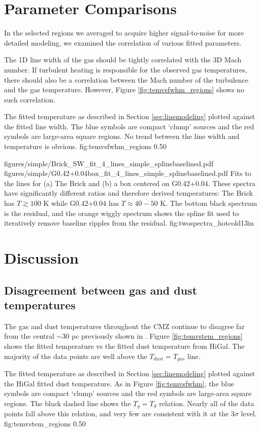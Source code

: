 \section{Parameter Comparisons}
In the selected regions we averaged to acquire higher signal-to-noise for more
detailed modeling, we examined the correlation of various fitted parameters.

The 1D line width of the gas should be tightly correlated with the 3D Mach
number.  If turbulent heating is responsible for the observed gas temperatures,
there should also be a correlation between the Mach number of the turbulence
and the gas temperature.  However, Figure \ref{fig:temvsfwhm_regions} shows no
such correlation.

{The fitted temperature as described in Section \ref{sec:linemodeling} plotted against
the fitted line width.  The blue symbols are compact `clump' sources and the red symbols
are large-area square regions.  No trend between the line width and temperature
is obvious.}
{fig:temvsfwhm_regions}
{0.5}{0}


\FigureTwo
{figures/simple/Brick_SW_fit_4_lines_simple_splinebaselined.pdf}
{figures/simple/G0.42+0.04box_fit_4_lines_simple_splinebaselined.pdf}
{Fits to the \para lines for (a) The Brick and (b) a box centered on G0.42+0.04.
These spectra have significantly different ratios and therefore derived temperatures:
The Brick has $T\gtrsim100$ K while G0.42+0.04 has $T\approx40-50$ K.
The bottom black spectrum is the residual, and the orange wiggly spectrum shows
the spline fit used to iteratively remove baseline ripples from the residual.}
{fig:twospectra_hotcold}{1}{3in}

\section{Discussion}
\subsection{Disagreement between gas and dust temperatures}
The gas and dust temperatures throughout the CMZ continue to disagree far from
the central $\sim30$ pc previously shown in \citet{Ao2013a}.
Figure \ref{fig:temvstem_regions} shows the fitted \para temperature vs the fitted
dust temperature from HiGal.  The majority of the \formaldehyde data points are well
above the $T_{dust}=T_{gas}$ line.

{The fitted temperature as described in Section \ref{sec:linemodeling} plotted
against the HiGal fitted dust temperature.  As in Figure \ref{fig:temvsfwhm},
the blue symbols are compact `clump' sources and the red symbols are large-area
square regions.  The black dashed line shows the $T_g = T_d$ relation.  Nearly
all of the data points fall above this relation, and very few are consistent
with it at the 3$\sigma$ level.}
{fig:temvstem_regions}
{0.5}{0}


